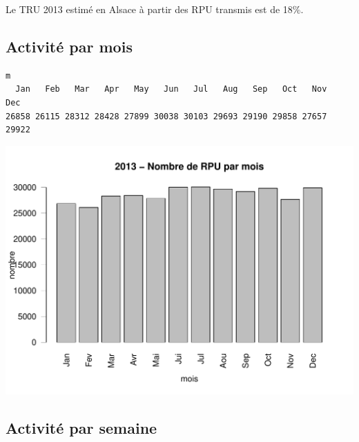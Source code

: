 \documentclass[12pt,english,french,twoside]{book}\usepackage[]{graphicx}\usepackage[]{color}
\makeatletter
\def\maxwidth{ %
  \ifdim\Gin@nat@width>\linewidth
    \linewidth
  \else
    \Gin@nat@width
  \fi
}
\newenvironment{kframe}{%
 \def\at@end@of@kframe{}%
 \ifinner\ifhmode%
  \def\at@end@of@kframe{\end{minipage}}%
  \begin{minipage}{\columnwidth}%
 \fi\fi%
 \def\FrameCommand##1{\hskip\@totalleftmargin \hskip-\fboxsep
 \colorbox{shadecolor}{##1}\hskip-\fboxsep
     \hskip-\linewidth \hskip-\@totalleftmargin \hskip\columnwidth}%
 \MakeFramed {\advance\hsize-\width
   \@totalleftmargin\z@ \linewidth\hsize
   \@setminipage}}%
 {\par\unskip\endMakeFramed%
 \at@end@of@kframe}
\newenvironment{knitrout}{}{} %
\makeatother
\begin{document}
Le TRU 2013 estimé en Alsace à partir des RPU transmis est de 18\%.

\subsection*{Activité par mois}

\begin{knitrout}
\color{fgcolor}\begin{kframe}
\begin{verbatim}
m
  Jan   Feb   Mar   Apr   May   Jun   Jul   Aug   Sep   Oct   Nov   Dec 
26858 26115 28312 28428 27899 30038 30103 29693 29190 29858 27657 29922 
\end{verbatim}
\end{kframe}
\end{knitrout}


\begin{center}
\begin{knitrout}
\color{fgcolor}
\includegraphics[width=\maxwidth]{figure/bp_parmois} 

\end{knitrout}

\label{fig:bp_parmois}
\end{center}

\subsection*{Activité par semaine}
\end{document}
